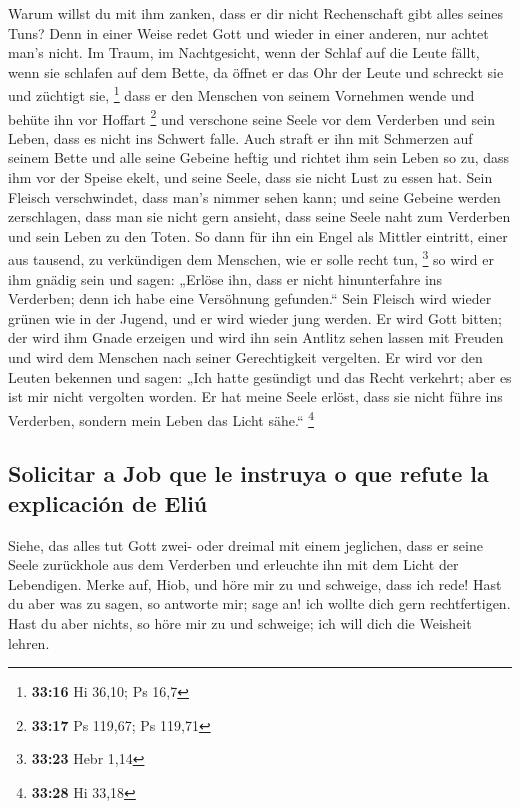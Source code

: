  Warum willst du mit ihm zanken, dass er dir nicht
Rechenschaft gibt alles seines Tuns?  Denn in einer Weise
redet Gott und wieder in einer anderen, nur achtet man's nicht.
 Im Traum, im Nachtgesicht, wenn der Schlaf auf die Leute
fällt, wenn sie schlafen auf dem Bette,  da öffnet er das
Ohr der Leute und schreckt sie und züchtigt sie, \footnote{\textbf{33:16}
  Hi 36,10; Ps 16,7}  dass er den Menschen von seinem
Vornehmen wende und behüte ihn vor Hoffart \footnote{\textbf{33:17} Ps
  119,67; Ps 119,71}  und verschone seine Seele vor dem
Verderben und sein Leben, dass es nicht ins Schwert falle.
 Auch straft er ihn mit Schmerzen auf seinem Bette und
alle seine Gebeine heftig  und richtet ihm sein Leben so
zu, dass ihm vor der Speise ekelt, und seine Seele, dass sie nicht Lust
zu essen hat.  Sein Fleisch verschwindet, dass man's
nimmer sehen kann; und seine Gebeine werden zerschlagen, dass man sie
nicht gern ansieht,  dass seine Seele naht zum Verderben
und sein Leben zu den Toten.  So dann für ihn ein Engel
als Mittler eintritt, einer aus tausend, zu verkündigen dem Menschen,
wie er solle recht tun, \footnote{\textbf{33:23} Hebr 1,14}
 so wird er ihm gnädig sein und sagen: „Erlöse ihn, dass
er nicht hinunterfahre ins Verderben; denn ich habe eine Versöhnung
gefunden.``  Sein Fleisch wird wieder grünen wie in der
Jugend, und er wird wieder jung werden.  Er wird Gott
bitten; der wird ihm Gnade erzeigen und wird ihn sein Antlitz sehen
lassen mit Freuden und wird dem Menschen nach seiner Gerechtigkeit
vergelten.  Er wird vor den Leuten bekennen und sagen:
„Ich hatte gesündigt und das Recht verkehrt; aber es ist mir nicht
vergolten worden.  Er hat meine Seele erlöst, dass sie
nicht führe ins Verderben, sondern mein Leben das Licht sähe.``
\footnote{\textbf{33:28} Hi 33,18}

\hypertarget{solicitar-a-job-que-le-instruya-o-que-refute-la-explicaciuxf3n-de-eliuxfa}{%
\subsection{Solicitar a Job que le instruya o que refute la explicación
de
Eliú}\label{solicitar-a-job-que-le-instruya-o-que-refute-la-explicaciuxf3n-de-eliuxfa}}

 Siehe, das alles tut Gott zwei- oder dreimal mit einem
jeglichen,  dass er seine Seele zurückhole aus dem
Verderben und erleuchte ihn mit dem Licht der Lebendigen.
 Merke auf, Hiob, und höre mir zu und schweige, dass ich
rede!  Hast du aber was zu sagen, so antworte mir; sage
an! ich wollte dich gern rechtfertigen.  Hast du aber
nichts, so höre mir zu und schweige; ich will dich die Weisheit lehren.

